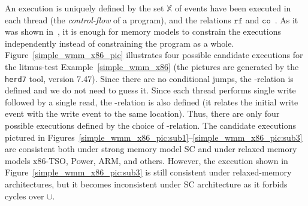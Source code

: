 An execution is uniquely defined by the set $\mathbb{X}$ of events have been executed in each thread (the \textit{control-flow} of a program), and the relations $\mathtt{rf}$ and $\mathtt{co}$~\cite{alglave2010shared}.
As it was shown in~\cite{wickerson2017automatically}, it is enough for memory models to constrain the executions independently instead of constraining the program as a whole.
Figure~\ref{simple_wmm_x86_pic} illustrates four possible candidate executions for the litmus-test Example~\ref{simple_wmm_x86} (the pictures are generated by the \texttt{herd7} tool, version 7.47). Since there are no conditional jumps, the \po-relation is defined and we do not need to guess it. Since each thread performs single write followed by a single read, the \co-relation is also defined (it relates the initial write event with the write event to the same location). Thus, there are only four possible executions defined by the choice of \rf-relation. The candidate executions pictured in Figures~\ref{simple_wmm_x86_pic:sub1}--\ref{simple_wmm_x86_pic:sub3} are consistent both under strong memory model SC and under relaxed memory models x86-TSO, Power, ARM, and others. However, the execution shown in Figure~\ref{simple_wmm_x86_pic:sub3} is still consistent under relaxed-memory architectures, but it becomes inconsistent under SC architecture as it forbids cycles over \fr$\cup$\po.


